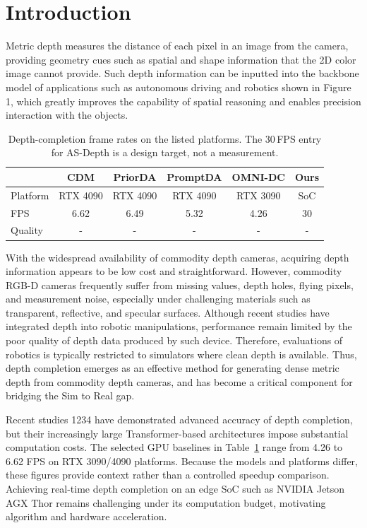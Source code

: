 \section{Introduction}
\label{sec:introduction}

Metric depth measures the distance of each pixel in an image from the camera, 
providing geometry cues such as spatial and shape information that the 2D color 
image cannot provide. 
Such depth information can be inputted into the backbone model of 
applications such as autonomous driving and robotics shown in Figure 1, 
which greatly improves
the capability of spatial reasoning and enables precision interaction 
with the objects.

\begin{table}[t]
  \caption{Depth-completion frame rates on the listed platforms. The
  30\,FPS entry for AS-Depth is a design target, not a measurement.}
  \label{tab:intro-framerate}
  \centering
  \small
  \setlength{\tabcolsep}{3pt}
  \renewcommand{\arraystretch}{1.2}
  \begin{tabular}{l|ccccc}
    \hline
    & CDM & PriorDA & PromptDA & OMNI-DC & Ours \\
    \hline
    Platform & RTX 4090 & RTX 4090 & RTX 4090 & RTX 3090 & SoC \\
    \hline
    FPS & 6.62 & 6.49 & 5.32 & 4.26 & 30 \\
    \hline
    Quality & - & - & - & - & - \\
    \hline
  \end{tabular}
\end{table}

With the widespread availability of commodity depth cameras, acquiring depth information appears to be low cost and straightforward. 
However, commodity RGB-D cameras frequently suffer from missing values, 
depth holes, flying pixels, and measurement noise, 
especially under challenging materials such as transparent, 
reflective, and specular surfaces. 
Although recent studies have integrated depth into robotic manipulations, performance remain limited by the poor quality of depth data produced by such device. Therefore, evaluations of robotics is typically restricted to simulators where clean depth is available. 
Thus, depth completion emerges as an effective method for generating dense metric depth from commodity depth cameras, and has become a critical component for bridging the Sim to Real gap. 

Recent studies 1234 have demonstrated advanced accuracy of depth completion, but their increasingly large Transformer-based architectures impose substantial computation costs. The selected GPU baselines in Table~\ref{tab:intro-framerate} range from 4.26 to 6.62 FPS on RTX 3090/4090 platforms. Because the models and platforms differ, these figures provide context rather than a controlled speedup comparison. Achieving real-time depth completion on an edge SoC such as NVIDIA Jetson AGX Thor remains challenging under its computation budget, motivating algorithm and hardware acceleration.

